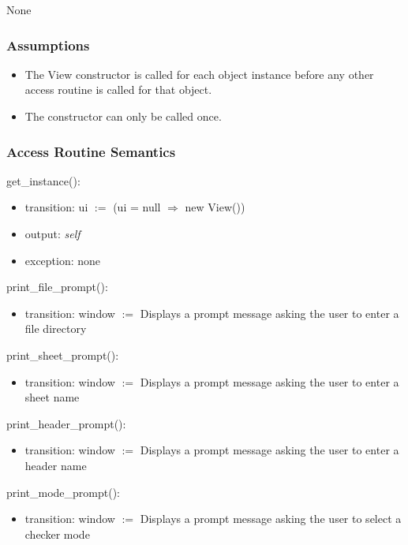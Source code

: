 \documentclass[12pt]{article}
\begin{document}
None

\subsubsection* {Assumptions}

\begin{itemize}
  \item The View constructor is called for each object instance before any 
  other access routine is called for that object.  
  \item The constructor can only be called once.
\end{itemize}


\subsubsection* {Access Routine Semantics}

\noindent get\_instance():
\begin{itemize}
\item transition: ui $:=$ (ui = null $\Rightarrow$ new View())
\item output: \textit{self}
\item exception: none
\end{itemize}

\noindent print\_file\_prompt():
\begin{itemize}
\item transition: window $:=$ Displays a prompt message asking the user to enter a file directory
\end{itemize}

\noindent print\_sheet\_prompt():
\begin{itemize}
\item transition: window $:=$ Displays a prompt message asking the user to enter a sheet name
\end{itemize}

\noindent print\_header\_prompt():
\begin{itemize}
\item transition: window $:=$ Displays a prompt message asking the user to enter a header name
\end{itemize}

\noindent print\_mode\_prompt():
\begin{itemize}
\item transition: window $:=$ Displays a prompt message asking the user to select a checker mode
\end{itemize}
\end{document}

